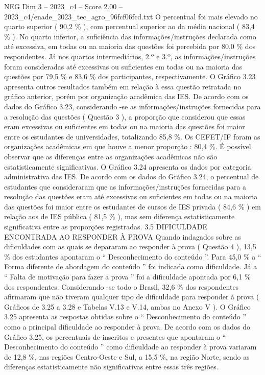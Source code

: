 \begin{textsample}{NEG Dim 3 – 2023\_c4 – Score 2.00 – 2023\_c4/enade\_2023\_tec\_agro\_96fcf06fcd.txt}
O percentual foi mais elevado no quarto superior ( 90,2 \% ), com percentual superior ao da média nacional ( 83,4 \% ).
No quarto inferior, a suficiência das informações/instruções declarada como até excessiva, em todas ou na maioria das questões foi percebida por 80,0 \% dos respondentes.
Já nos quartos intermediários, 2.º e 3.º, as informações/instruções foram consideradas até excessivas ou suficientes em todas ou na maioria das questões por 79,5 \% e 83,6 \% dos participantes, respectivamente.
O Gráfico 3.23 apresenta outros resultados também em relação à essa questão retratada no gráfico anterior, porém por organização acadêmica das IES.
De acordo com os dados do Gráfico 3.23, considerando -se as informações/instruções fornecidas para a resolução das questões ( Questão 3 ), a proporção que considerou que essas eram excessivas ou suficientes em todas ou na maioria das questões foi maior entre os estudantes de universidades, totalizando 85,8 \%.
Os CEFET/IF foram as organizações acadêmicas em que houve a menor proporção : 80,4 \%.
É possível observar que as diferenças entre as organizações acadêmicas não são estatisticamente significativas.
O Gráfico 3.24 apresenta os dados por categoria administrativa das IES.
De acordo com os dados do Gráfico 3.24, o percentual de estudantes que consideraram que as informações/instruções fornecidas para a resolução das questões eram até excessivas ou suficientes em todas ou na maioria das questões foi maior entre os estudantes de cursos de IES privada ( 84,6 \% ) em relação aos de IES pública ( 81,5 \% ), mas sem diferença estatisticamente significativa entre as proporções registradas. 3.5 DIFICULDADE ENCONTRADA AO RESPONDER À PROVA Quando indagados sobre as dificuldades com as quais se depararam ao responder à prova ( Questão 4 ), 13,5 \% dos estudantes apontaram o “ Desconhecimento do conteúdo ”.
Para 45,0 \% a “ Forma diferente de abordagem do conteúdo ” foi indicada como dificuldade.
Já a “ Falta de motivação para fazer a prova ” foi a dificuldade apontada por 6,1 \% dos respondentes.
Considerando -se todo o Brasil, 32,6 \% dos respondentes afirmaram que não tiveram qualquer tipo de dificuldade para responder à prova ( Gráficos de 3.25 a 3.28 e Tabelas V.13 e V.14, ambas no Anexo V ).
O Gráfico 3.25 apresenta as respostas obtidas sobre o “ Desconhecimento do conteúdo ” como a principal dificuldade ao responder à prova.
De acordo com os dados do Gráfico 3.25, os percentuais de inscritos e presentes que apontaram o “ Desconhecimento do conteúdo ” como dificuldade ao responder à prova variaram de 12,8 \%, nas regiões Centro-Oeste e Sul, a 15,5 \%, na região Norte, sendo as diferenças estatisticamente não significativas entre essas três regiões.

\end{textsample}

